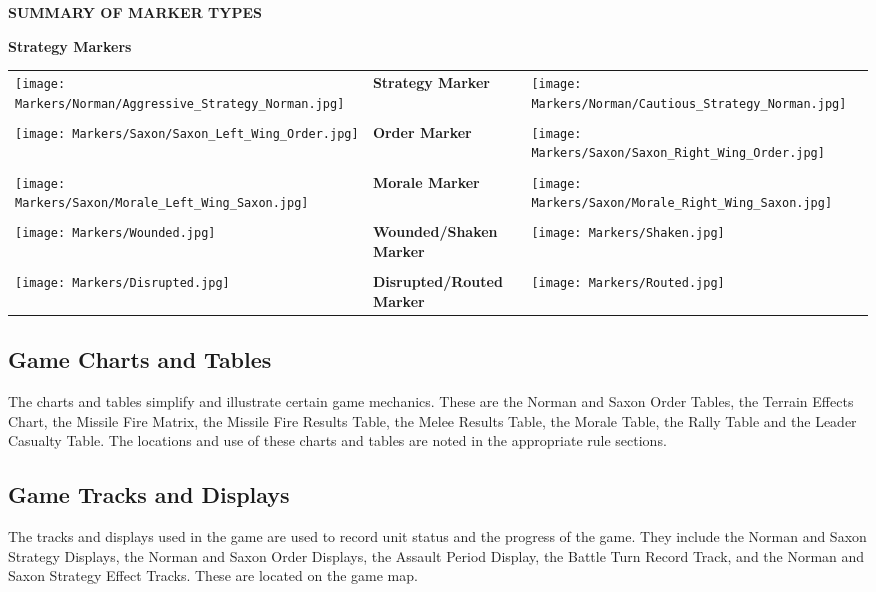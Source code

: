 \break

\par
\begin{center}
  \textbf{SUMMARY OF MARKER TYPES}
  \break
  \par
  \textbf{Strategy Markers}
\end{center}

\begin{tabularx}{0.5\textwidth}{
    >{\raggedright\arraybackslash}X
    >{\centering\arraybackslash}X
    >{\raggedleft\arraybackslash}X}
  \texttt{[image: Markers/Norman/Aggressive\_Strategy\_Norman.jpg]} &
  \textbf{Strategy Marker} &
  \texttt{[image: Markers/Norman/Cautious\_Strategy\_Norman.jpg]} \\ \\
  \texttt{[image: Markers/Saxon/Saxon\_Left\_Wing\_Order.jpg]} &
  \textbf{Order Marker} &
  \texttt{[image: Markers/Saxon/Saxon\_Right\_Wing\_Order.jpg]} \\ \\
  \texttt{[image: Markers/Saxon/Morale\_Left\_Wing\_Saxon.jpg]} &
  \textbf{Morale Marker} &
  \texttt{[image: Markers/Saxon/Morale\_Right\_Wing\_Saxon.jpg]} \\ \\
  \texttt{[image: Markers/Wounded.jpg]} &
  \textbf{Wounded/Shaken Marker} &
  \texttt{[image: Markers/Shaken.jpg]} \\ \\
  \texttt{[image: Markers/Disrupted.jpg]} &
  \textbf{Disrupted/Routed Marker} &
  \texttt{[image: Markers/Routed.jpg]}
\end{tabularx}


\subsection{Game Charts and Tables}


The charts and tables simplify and illustrate certain game mechanics. These are the Norman and Saxon Order Tables, the Terrain Effects Chart, the Missile Fire Matrix, the Missile Fire Results Table, the Melee Results Table, the Morale Table, the Rally Table and the Leader Casualty Table. The locations and use of these charts and tables are noted in the appropriate rule sections.

\subsection{Game Tracks and Displays}

The tracks and displays used in the game are used to record unit status and the progress of the game. They include the Norman and Saxon Strategy Displays, the Norman and Saxon Order Displays, the Assault Period Display, the Battle Turn Record Track, and the Norman and Saxon Strategy Effect Tracks. These are located on the game map.

